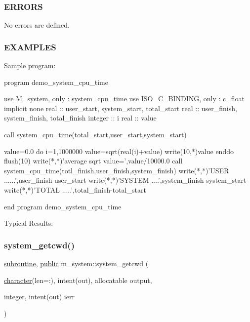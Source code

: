 \subsubsection*{E\+R\+R\+O\+RS}

No errors are defined.

\subsubsection*{E\+X\+A\+M\+P\+L\+ES}

\begin{DoxyVerb}Sample program:

   program demo_system_cpu_time

   use M_system, only : system_cpu_time
   use ISO_C_BINDING, only : c_float
   implicit none
   real    :: user_start, system_start, total_start
   real    :: user_finish, system_finish, total_finish
   integer :: i
   real    :: value

      call system_cpu_time(total_start,user_start,system_start)

      value=0.0
      do i=1,1000000
         value=sqrt(real(i)+value)
         write(10,*)value
      enddo
      flush(10)
      write(*,*)'average sqrt value=',value/10000.0
      call system_cpu_time(totl_finish,user_finish,system_finish)
      write(*,*)'USER ......',user_finish-user_start
      write(*,*)'SYSTEM ....',system_finish-system_start
      write(*,*)'TOTAL .....',total_finish-total_start

   end program demo_system_cpu_time

Typical Results: \end{DoxyVerb}
 \mbox{\label{namespacem__system_a5a32db818a9ffb0a4ea724e95356c560}} 
\subsubsection{\texorpdfstring{system\+\_\+getcwd()}{system\_getcwd()}}
{\footnotesize\ttfamily \hyperlink{M__stopwatch_83_8txt_acfbcff50169d691ff02d4a123ed70482}{subroutine}, \hyperlink{M__stopwatch_83_8txt_a2f74811300c361e53b430611a7d1769f}{public} m\+\_\+system\+::system\+\_\+getcwd (\begin{DoxyParamCaption}\item[{\hyperlink{option__stopwatch_83_8txt_abd4b21fbbd175834027b5224bfe97e66}{character}(len=\+:), intent(out), allocatable}]{output,  }\item[{integer, intent(out)}]{ierr }\end{DoxyParamCaption})}



